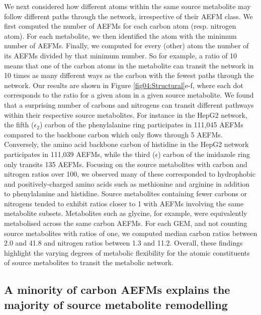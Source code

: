 \documentclass[12pt]{article}
\begin{document}
We next considered how different atoms within the same source metabolite
may follow different paths through the network, irrespective of their AEFM
class. We first computed the number of AEFMs for each carbon atom (resp.
nitrogen atom). For each metabolite, we then identified the atom with the
minimum number of AEFMs. Finally, we computed for every (other) atom the
number of its AEFMs divided by that minimum number. So for example,
a ratio of 10 means that one of the carbon atoms in the metabolite can
transit the network in 10 times as many different ways as the carbon with
the fewest paths through the network. Our results are shown in Figure
\ref{fig04:Structural}e-f, where each dot corresponds to the ratio for
a given atom in a given source metabolite. We found that a surprising
number of carbons and nitrogens can transit different pathways within
their respective source metabolites. For instance in the HepG2 network,
the fifth ($\epsilon_2$) carbon of the phenylalanine ring participates in
111,045 AEFMs compared to the backbone carbon which only flows through
5 AEFMs. Conversely, the amino acid backbone carbon of histidine in the
  HepG2 network participates in 111,039 AEFMs, while the third
  ($\epsilon$) carbon of the imidazole ring only transits 135 AEFMs.
  Focusing on the source metabolites with carbon and nitrogen ratios over
  100, we observed many of these corresponded to hydrophobic and
  positively-charged amino acids such as methionine and arginine in
  addition to phenylalanine and histidine. Source metabolites containing
  fewer carbons or nitrogens tended to exhibit ratios closer to
  1 with AEFMs involving the same metabolite subsets. Metabolites such as
    glycine, for example, were equivalently metabolised across the same
    carbon AEFMs. For each GEM, and not counting source metabolites with
    ratios of one, we computed median carbon ratios between
  2.0 and 41.8 and nitrogen ratios between 1.3 and
  11.2. Overall, these findings highlight the varying degrees of metabolic
  flexibility for the atomic constituents of source metabolites to transit
  the metabolic network.

\subsection*{A minority of carbon AEFMs explains the majority of source metabolite remodelling}

\end{document}
